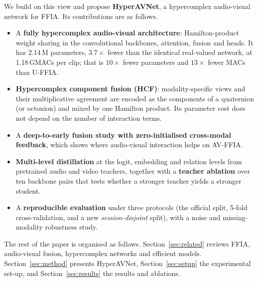 We build on this view and propose \textbf{HyperAVNet}, a hypercomplex audio-visual network for FFIA. Its
contributions are as follows.
\begin{itemize}
  \item A \textbf{fully hypercomplex audio-visual architecture}: Hamilton-product weight sharing in the
  convolutional backbones, attention, fusion and heads. It has 2.14\,M parameters, $3.7\times$ fewer than
  the identical real-valued network, at 1.18\,GMACs per clip; that is $10\times$ fewer parameters and
  $13\times$ fewer MACs than U-FFIA.
  \item \textbf{Hypercomplex component fusion (HCF)}: modality-specific views and their multiplicative
  agreement are encoded as the components of a quaternion (or octonion) and mixed by one Hamilton
  product. Its parameter cost does not depend on the number of interaction terms.
  \item A \textbf{deep-to-early fusion study with zero-initialised cross-modal feedback}, which shows where
  audio-visual interaction helps on AV-FFIA. 
  \item \textbf{Multi-level distillation} at the logit, embedding and relation levels from pretrained
  audio and video teachers, together with a \textbf{teacher ablation} over ten backbone pairs that
  tests whether a stronger teacher yields a stronger student. 
  \item A \textbf{reproducible evaluation} under three protocols (the official split, 5-fold
  cross-validation, and a new \emph{session-disjoint} split), with a noise and missing-modality
  robustness study. 
\end{itemize}

The rest of the paper is organised as follows. Section~\ref{sec:related} reviews FFIA, audio-visual
fusion, hypercomplex networks and efficient models. Section~\ref{sec:method} presents HyperAVNet,
Section~\ref{sec:setup} the experimental set-up, and Section~\ref{sec:results} the results and
ablations.
